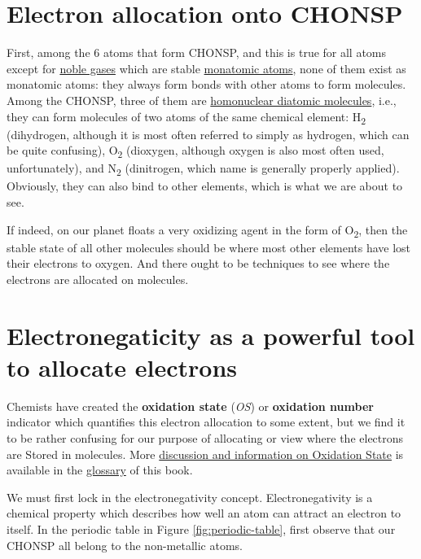 \documentclass[]{book}
\theoremstyle{definition}
\theoremstyle{definition}
\theoremstyle{definition}
\theoremstyle{remark}
\begin{document}
\section{Electron allocation onto
CHONSP}\label{electron-allocation-onto-chonsp}

First, among the 6 atoms that form CHONSP, and this is true for all
atoms except for \href{https://en.wikipedia.org/wiki/Noble_gas}{noble
gases} which are stable
\href{https://en.wikipedia.org/wiki/Monatomic_gas}{monatomic atoms},
none of them exist as monatomic atoms: they always form bonds with other
atoms to form molecules. Among the CHONSP, three of them are
\href{https://en.wikipedia.org/wiki/Diatomic_molecule}{homonuclear
diatomic molecules}, i.e., they can form molecules of two atoms of the
same chemical element: H\textsubscript{2} (dihydrogen, although it is
most often referred to simply as hydrogen, which can be quite
confusing), O\textsubscript{2} (dioxygen, although oxygen is also most
often used, unfortunately), and N\textsubscript{2} (dinitrogen, which
name is generally properly applied). Obviously, they can also bind to
other elements, which is what we are about to see.

If indeed, on our planet floats a very oxidizing agent in the form of
O\textsubscript{2}, then the stable state of all other molecules should
be where most other elements have lost their electrons to oxygen. And
there ought to be techniques to see where the electrons are allocated on
molecules.

\section{Electronegaticity as a powerful tool to allocate
electrons}\label{electronegaticity-as-a-powerful-tool-to-allocate-electrons}

Chemists have created the \textbf{oxidation state} (\emph{OS}) or
\textbf{oxidation number} indicator which quantifies this electron
allocation to some extent, but we find it to be rather confusing for our
purpose of allocating or view where the electrons are Stored in
molecules. More \protect\hyperlink{oxidation-state}{discussion and
information on Oxidation State} is available in the
\protect\hyperlink{glossary}{glossary} of this book.

We must first lock in the electronegativity concept. Electronegativity
is a chemical property which describes how well an atom can attract an
electron to itself. In the periodic table in Figure
\ref{fig:periodic-table}, first observe that our CHONSP all belong to
the non-metallic atoms.
\end{document}
